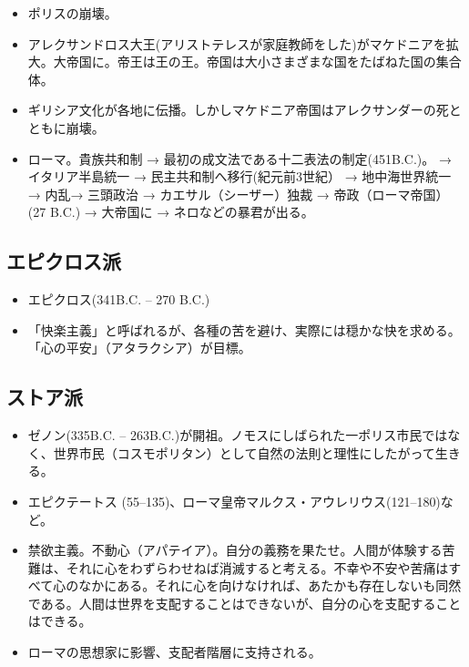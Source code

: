 \documentclass[uplatex,dvipdfmx]{jsarticle} \usepackage{mystyle}%
\begin{document}
\begin{itemize}
\item ポリスの崩壊。
\item アレクサンドロス大王(アリストテレスが家庭教師をした)がマケドニアを拡大。大帝国に。帝王は王の王。帝国は大小さまざまな国をたばねた国の集合体。
\item  ギリシア文化が各地に伝播。しかしマケドニア帝国はアレクサンダーの死とともに崩壊。
\item ローマ。貴族共和制 → 最初の成文法である十二表法の制定(451B.C.)。 → イタリア半島統一 → 民主共和制へ移行(紀元前3世紀） → 地中海世界統一 → 内乱→ 三頭政治 → カエサル（シーザー）独裁 → 帝政（ローマ帝国）(27 B.C.) → 大帝国に → ネロなどの暴君が出る。
\end{itemize}

\subsection{エピクロス派}

\begin{itemize}
\item エピクロス(341B.C. -- 270 B.C.)
\item 「快楽主義」と呼ばれるが、各種の苦を避け、実際には穏かな快を求める。「心の平安」（アタラクシア）が目標。

\end{itemize}

\subsection{ストア派}
\begin{itemize}
\item ゼノン(335B.C. -- 263B.C.)が開祖。ノモスにしばられた一ポリス市民ではなく、世界市民（コスモポリタン）として自然の法則と理性にしたがって生きる。

\item エピクテートス (55--135)、ローマ皇帝マルクス・アウレリウス(121--180)など。

\item   禁欲主義。不動心（アパテイア）。自分の義務を果たせ。人間が体験する苦難は、それに心をわずらわせねば消滅すると考える。不幸や不安や苦痛はすべて心のなかにある。それに心を向けなければ、あたかも存在しないも同然である。人間は世界を支配することはできないが、自分の心を支配することはできる。

\item   ローマの思想家に影響、支配者階層に支持される。
\end{itemize}
\end{document}
